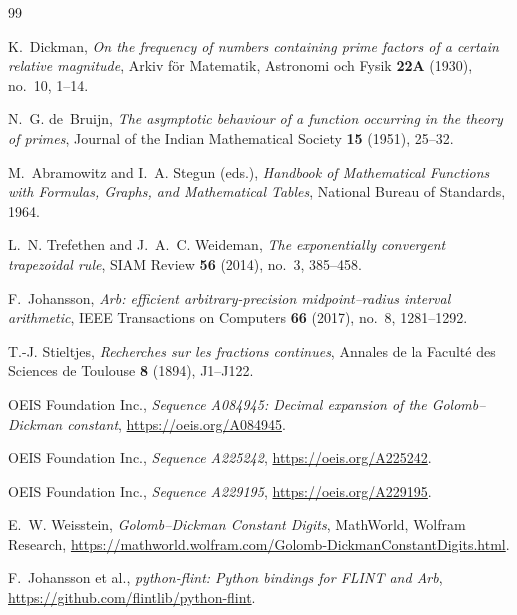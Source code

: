 \documentclass[11pt,a4paper]{article}
\theoremstyle{remark}
\begin{document}
\begin{thebibliography}{99}

K.~Dickman,
\emph{On the frequency of numbers containing prime factors of a certain
relative magnitude},
Arkiv f\"or Matematik, Astronomi och Fysik \textbf{22A} (1930), no.~10,
1--14.

N.~G. de~Bruijn,
\emph{The asymptotic behaviour of a function occurring in the theory of
primes},
Journal of the Indian Mathematical Society \textbf{15} (1951), 25--32.

M.~Abramowitz and I.~A. Stegun (eds.),
\emph{Handbook of Mathematical Functions with Formulas, Graphs, and
Mathematical Tables},
National Bureau of Standards, 1964.

L.~N. Trefethen and J.~A.~C. Weideman,
\emph{The exponentially convergent trapezoidal rule},
SIAM Review \textbf{56} (2014), no.~3, 385--458.

F.~Johansson,
\emph{Arb: efficient arbitrary-precision midpoint--radius interval
arithmetic},
IEEE Transactions on Computers \textbf{66} (2017), no.~8, 1281--1292.

T.-J. Stieltjes,
\emph{Recherches sur les fractions continues},
Annales de la Facult\'e des Sciences de Toulouse \textbf{8} (1894),
J1--J122.

OEIS Foundation Inc.,
\emph{Sequence A084945: Decimal expansion of the Golomb--Dickman
constant},
\url{https://oeis.org/A084945}.

OEIS Foundation Inc.,
\emph{Sequence A225242},
\url{https://oeis.org/A225242}.

OEIS Foundation Inc.,
\emph{Sequence A229195},
\url{https://oeis.org/A229195}.

E.~W. Weisstein,
\emph{Golomb--Dickman Constant Digits},
MathWorld, Wolfram Research,
\url{https://mathworld.wolfram.com/Golomb-DickmanConstantDigits.html}.

F.~Johansson et al.,
\emph{python-flint: Python bindings for FLINT and Arb},
\url{https://github.com/flintlib/python-flint}.

\end{thebibliography}
\end{document}
